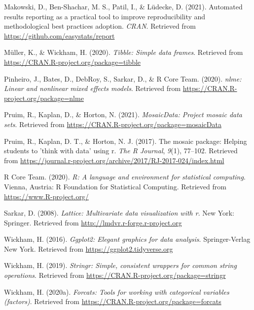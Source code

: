 \documentclass[
  english,
  man]{apa6}
\newlength{\cslhangindent}
\newenvironment{cslreferences}%
  {\setlength{\parindent}{0pt}%
  \everypar{\setlength{\hangindent}{\cslhangindent}}\ignorespaces}%
  {\par}
\begin{document}
\begin{cslreferences}
\leavevmode\hypertarget{ref-R-report}{}%
Makowski, D., Ben-Shachar, M. S., Patil, I., \& Lüdecke, D. (2021). Automated results reporting as a practical tool to improve reproducibility and methodological best practices adoption. \emph{CRAN}. Retrieved from \url{https://github.com/easystats/report}

\leavevmode\hypertarget{ref-R-tibble}{}%
Müller, K., \& Wickham, H. (2020). \emph{Tibble: Simple data frames}. Retrieved from \url{https://CRAN.R-project.org/package=tibble}

\leavevmode\hypertarget{ref-R-nlme}{}%
Pinheiro, J., Bates, D., DebRoy, S., Sarkar, D., \& R Core Team. (2020). \emph{nlme: Linear and nonlinear mixed effects models}. Retrieved from \url{https://CRAN.R-project.org/package=nlme}

\leavevmode\hypertarget{ref-R-mosaicData}{}%
Pruim, R., Kaplan, D., \& Horton, N. (2021). \emph{MosaicData: Project mosaic data sets}. Retrieved from \url{https://CRAN.R-project.org/package=mosaicData}

\leavevmode\hypertarget{ref-R-mosaic}{}%
Pruim, R., Kaplan, D. T., \& Horton, N. J. (2017). The mosaic package: Helping students to 'think with data' using r. \emph{The R Journal}, \emph{9}(1), 77--102. Retrieved from \url{https://journal.r-project.org/archive/2017/RJ-2017-024/index.html}

\leavevmode\hypertarget{ref-R-base}{}%
R Core Team. (2020). \emph{R: A language and environment for statistical computing}. Vienna, Austria: R Foundation for Statistical Computing. Retrieved from \url{https://www.R-project.org/}

\leavevmode\hypertarget{ref-R-lattice}{}%
Sarkar, D. (2008). \emph{Lattice: Multivariate data visualization with r}. New York: Springer. Retrieved from \url{http://lmdvr.r-forge.r-project.org}

\leavevmode\hypertarget{ref-R-ggplot2}{}%
Wickham, H. (2016). \emph{Ggplot2: Elegant graphics for data analysis}. Springer-Verlag New York. Retrieved from \url{https://ggplot2.tidyverse.org}

\leavevmode\hypertarget{ref-R-stringr}{}%
Wickham, H. (2019). \emph{Stringr: Simple, consistent wrappers for common string operations}. Retrieved from \url{https://CRAN.R-project.org/package=stringr}

\leavevmode\hypertarget{ref-R-forcats}{}%
Wickham, H. (2020a). \emph{Forcats: Tools for working with categorical variables (factors)}. Retrieved from \url{https://CRAN.R-project.org/package=forcats}


\end{cslreferences}
\end{document}
